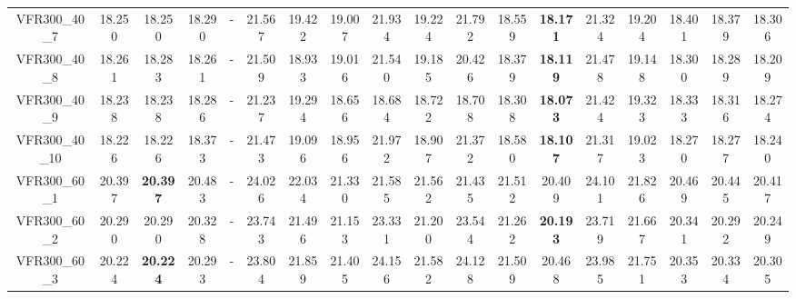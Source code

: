 \begin{tabular}{cc|ccc|ccccccccccccc}
VFR300\_40\_7      & 18.250           & 18.250           & 18.290           & -                & 21.567           & 19.422           & 19.007           & 21.934           & 19.224           & 21.792           & 18.559           & {\bf 18.171}     & 21.324           & 19.204           & 18.401           & 18.379           & 18.306          \\ 
VFR300\_40\_8      & 18.261           & 18.283           & 18.261           & -                & 21.509           & 18.933           & 19.016           & 21.540           & 19.185           & 20.426           & 18.379           & {\bf 18.119}     & 21.478           & 19.148           & 18.300           & 18.289           & 18.209          \\ 
VFR300\_40\_9      & 18.238           & 18.238           & 18.286           & -                & 21.237           & 19.294           & 18.656           & 18.684           & 18.722           & 18.708           & 18.308           & {\bf 18.073}     & 21.424           & 19.323           & 18.333           & 18.316           & 18.274          \\ 
VFR300\_40\_10     & 18.226           & 18.226           & 18.373           & -                & 21.473           & 19.096           & 18.956           & 21.972           & 18.907           & 21.372           & 18.580           & {\bf 18.107}     & 21.317           & 19.023           & 18.270           & 18.277           & 18.240          \\ 
VFR300\_60\_1      & 20.397           & {\bf 20.397}     & 20.483           & -                & 24.026           & 22.034           & 21.330           & 21.585           & 21.562           & 21.435           & 21.512           & 20.409           & 24.101           & 21.826           & 20.469           & 20.445           & 20.417          \\ 
VFR300\_60\_2      & 20.290           & 20.290           & 20.328           & -                & 23.743           & 21.496           & 21.153           & 23.331           & 21.200           & 23.544           & 21.262           & {\bf 20.193}     & 23.719           & 21.667           & 20.341           & 20.292           & 20.249          \\ 
VFR300\_60\_3      & 20.224           & {\bf 20.224}     & 20.293           & -                & 23.804           & 21.859           & 21.405           & 24.156           & 21.582           & 24.128           & 21.509           & 20.468           & 23.985           & 21.751           & 20.353           & 20.334           & 20.305          \\ 

\end{tabular}
